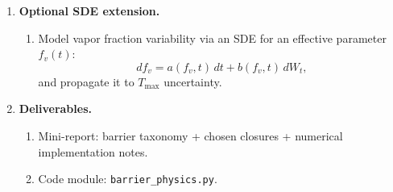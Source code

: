 \documentclass[11pt]{article}
\begin{document}
\begin{enumerate}
		\item \textbf{Optional SDE extension.}
		\begin{enumerate}
			\item Model vapor fraction variability via an SDE for an effective parameter $f_v(t)$:
			\[
			df_v=a(f_v,t)\,dt + b(f_v,t)\,dW_t,
			\]
			and propagate it to $T_{\max}$ uncertainty.
		\end{enumerate}
		
		\item \textbf{Deliverables.}
		\begin{enumerate}
			\item Mini-report: barrier taxonomy + chosen closures + numerical implementation notes.
			\item Code module: \texttt{barrier\_physics.py}.
		\end{enumerate}
	\end{enumerate}
	
	\newpage
	
\end{document}
